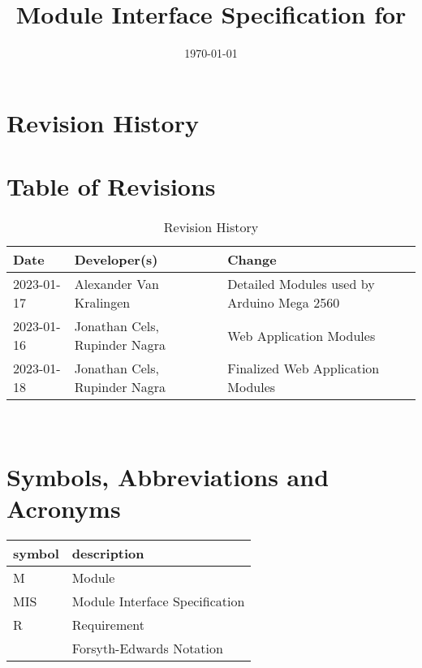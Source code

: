 \documentclass[12pt, titlepage]{article}
\begin{document}
\title{Module Interface Specification for \progname{}}

\author{\progname}

\date{\today}

\maketitle


\section{Revision History}

\section*{Table of Revisions}
\begin{table}[hp]
\caption{Revision History} \label{TblRevisionHistory}
\begin{tabularx}{\textwidth}{llX}
\toprule
\textbf{Date} & \textbf{Developer(s)} & \textbf{Change}\\
\midrule
2023-01-17 & Alexander Van Kralingen & Detailed Modules used by Arduino Mega 2560\\
2023-01-16 & Jonathan Cels, Rupinder Nagra & Web Application Modules\\
2023-01-18 & Jonathan Cels, Rupinder Nagra & Finalized Web Application Modules\\
\bottomrule
\end{tabularx}
\end{table}

~\newpage

\section{Symbols, Abbreviations and Acronyms}

\renewcommand{\arraystretch}{1.2}
\begin{tabular}{l l} 
  \toprule		
  \textbf{symbol} & \textbf{description}\\
  \midrule 
  M & Module \\
  MIS & Module Interface Specification \\
  R & Requirement\\
  \cite{FEN} & Forsyth-Edwards Notation\\
  \bottomrule
\end{tabular}\\
\end{document}
